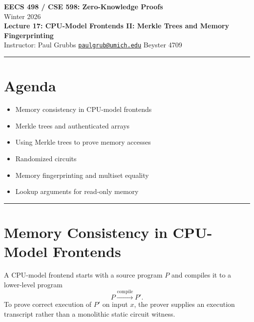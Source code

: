 \documentclass[11pt]{article}
\begin{document}
\begin{center}
  {\LARGE \textbf{EECS 498 / CSE 598: Zero-Knowledge Proofs}}\\[6pt]
  {\large Winter 2026}\\[4pt]
  {\large \textbf{Lecture 17: CPU-Model Frontends II: Merkle Trees and Memory Fingerprinting}}\\[4pt]
  {\large Instructor: Paul Grubbs \quad
    \href{mailto:paulgrub@umich.edu}{\texttt{paulgrub@umich.edu}} \quad
    Beyster 4709}
\end{center}

\vspace{0.5em}
\hrule
\vspace{1em}

\section*{Agenda}
\begin{itemize}
  \item Memory consistency in CPU-model frontends
  \item Merkle trees and authenticated arrays
  \item Using Merkle trees to prove memory accesses
  \item Randomized circuits
  \item Memory fingerprinting and multiset equality
  \item Lookup arguments for read-only memory
\end{itemize}

\hrule
\vspace{1em}

\section{Memory Consistency in CPU-Model Frontends}

A CPU-model frontend starts with a source program $P$ and compiles it to a
lower-level program
\[
  P \xrightarrow{\mathrm{compile}} P'.
\]
To prove correct execution of $P'$ on input $x$, the prover supplies an
execution transcript rather than a monolithic static circuit witness.
\end{document}
